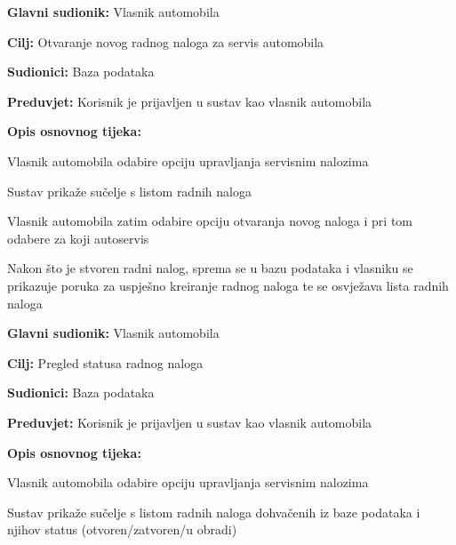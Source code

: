 \noindent {}
\begin{packed_item}
	
	\item \textbf{Glavni sudionik: } Vlasnik automobila
	\item  \textbf{Cilj:} Otvaranje novog radnog naloga za servis automobila
	\item  \textbf{Sudionici:} Baza podataka
	\item  \textbf{Preduvjet:} Korisnik je prijavljen u sustav kao vlasnik automobila
	\item  \textbf{Opis osnovnog tijeka:}
	
	\item[] \begin{packed_enum}
		
		\item Vlasnik automobila odabire opciju upravljanja servisnim nalozima
		\item Sustav prikaže sučelje s listom radnih naloga
		\item Vlasnik automobila zatim odabire opciju otvaranja novog naloga i pri
		tom odabere za koji autoservis
		\item Nakon što je stvoren radni nalog, sprema se u bazu podataka i vlasniku se prikazuje poruka za uspješno kreiranje radnog naloga te se osvježava lista radnih naloga
		
	\end{packed_enum}
\end{packed_item}

\noindent {}
\begin{packed_item}
	
	\item \textbf{Glavni sudionik: } Vlasnik automobila
	\item  \textbf{Cilj:} Pregled statusa radnog naloga
	\item  \textbf{Sudionici:} Baza podataka
	\item  \textbf{Preduvjet:} Korisnik je prijavljen u sustav kao vlasnik automobila
	\item  \textbf{Opis osnovnog tijeka:}
	
	\item[] \begin{packed_enum}
		
		\item Vlasnik automobila odabire opciju upravljanja servisnim nalozima
		\item Sustav prikaže sučelje s listom radnih naloga dohvačenih iz baze podataka i njihov status
		(otvoren/zatvoren/u obradi)
		
	\end{packed_enum}
\end{packed_item}

